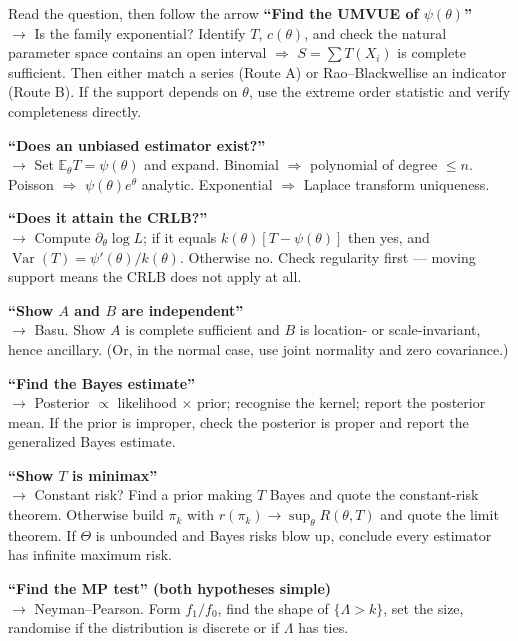 \documentclass[11pt]{article}
\theoremstyle{remark}
\newcommand{\E}{\mathbb{E}}
\newcommand{\Var}{\operatorname{Var}}
\begin{document}
\begin{recipebox}{Read the question, then follow the arrow}
\textbf{``Find the UMVUE of $\psi(\theta)$''}\\
$\to$ Is the family exponential? Identify $T$, $c(\theta)$, and check the natural parameter
space contains an open interval $\Rightarrow$ $S=\sum T(X_i)$ is complete sufficient.
Then either match a series (Route A) or Rao--Blackwellise an indicator (Route B).
If the support depends on $\theta$, use the extreme order statistic and verify completeness
directly.

\smallskip
\textbf{``Does an unbiased estimator exist?''}\\
$\to$ Set $\E_\theta T=\psi(\theta)$ and expand. Binomial $\Rightarrow$ polynomial of degree
$\le n$. Poisson $\Rightarrow$ $\psi(\theta)e^{\theta}$ analytic. Exponential $\Rightarrow$
Laplace transform uniqueness.

\smallskip
\textbf{``Does it attain the CRLB?''}\\
$\to$ Compute $\partial_\theta\log L$; if it equals $k(\theta)[T-\psi(\theta)]$ then yes, and
$\Var(T)=\psi'(\theta)/k(\theta)$. Otherwise no. Check regularity first --- moving support
means the CRLB does not apply at all.

\smallskip
\textbf{``Show $A$ and $B$ are independent''}\\
$\to$ Basu. Show $A$ is complete sufficient and $B$ is location- or scale-invariant, hence
ancillary. (Or, in the normal case, use joint normality and zero covariance.)

\smallskip
\textbf{``Find the Bayes estimate''}\\
$\to$ Posterior $\propto$ likelihood $\times$ prior; recognise the kernel; report the
posterior mean. If the prior is improper, check the posterior is proper and report the
generalized Bayes estimate.

\smallskip
\textbf{``Show $T$ is minimax''}\\
$\to$ Constant risk? Find a prior making $T$ Bayes and quote the constant-risk theorem.
Otherwise build $\pi_k$ with $r(\pi_k)\to\sup_\theta R(\theta,T)$ and quote the limit theorem.
If $\Theta$ is unbounded and Bayes risks blow up, conclude every estimator has infinite
maximum risk.

\smallskip
\textbf{``Find the MP test'' (both hypotheses simple)}\\
$\to$ Neyman--Pearson. Form $f_1/f_0$, find the shape of $\{\Lambda>k\}$, set the size,
randomise if the distribution is discrete or if $\Lambda$ has ties.


\end{recipebox}
\end{document}

